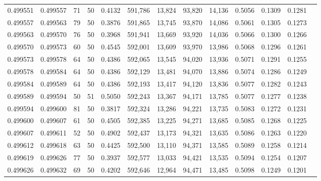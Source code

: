 \begin{tabular}{rrrrrrrrrrrrr}
0.499551 & 0.499557 &    71 &  50 &                                     0.4132 & 591,786 &  13,824 &  93,820 &  14,136 & 0.5056 & 0.1309 & 0.1281 \\
0.499557 & 0.499563 &    79 &  50 &                                     0.3876 & 591,865 &  13,745 &  93,870 &  14,086 & 0.5061 & 0.1305 & 0.1273 \\
0.499563 & 0.499570 &    76 &  50 &                                     0.3968 & 591,941 &  13,669 &  93,920 &  14,036 & 0.5066 & 0.1300 & 0.1266 \\
0.499570 & 0.499573 &    60 &  50 &                                     0.4545 & 592,001 &  13,609 &  93,970 &  13,986 & 0.5068 & 0.1296 & 0.1261 \\
0.499573 & 0.499578 &    64 &  50 &                                     0.4386 & 592,065 &  13,545 &  94,020 &  13,936 & 0.5071 & 0.1291 & 0.1255 \\
0.499578 & 0.499584 &    64 &  50 &                                     0.4386 & 592,129 &  13,481 &  94,070 &  13,886 & 0.5074 & 0.1286 & 0.1249 \\
0.499584 & 0.499589 &    64 &  50 &                                     0.4386 & 592,193 &  13,417 &  94,120 &  13,836 & 0.5077 & 0.1282 & 0.1243 \\
0.499589 & 0.499594 &    50 &  51 &                                     0.5050 & 592,243 &  13,367 &  94,171 &  13,785 & 0.5077 & 0.1277 & 0.1238 \\
0.499594 & 0.499600 &    81 &  50 &                                     0.3817 & 592,324 &  13,286 &  94,221 &  13,735 & 0.5083 & 0.1272 & 0.1231 \\
0.499600 & 0.499607 &    61 &  50 &                                     0.4505 & 592,385 &  13,225 &  94,271 &  13,685 & 0.5085 & 0.1268 & 0.1225 \\
0.499607 & 0.499611 &    52 &  50 &                                     0.4902 & 592,437 &  13,173 &  94,321 &  13,635 & 0.5086 & 0.1263 & 0.1220 \\
0.499612 & 0.499618 &    63 &  50 &                                     0.4425 & 592,500 &  13,110 &  94,371 &  13,585 & 0.5089 & 0.1258 & 0.1214 \\
0.499619 & 0.499626 &    77 &  50 &                                     0.3937 & 592,577 &  13,033 &  94,421 &  13,535 & 0.5094 & 0.1254 & 0.1207 \\
0.499626 & 0.499632 &    69 &  50 &                                     0.4202 & 592,646 &  12,964 &  94,471 &  13,485 & 0.5098 & 0.1249 & 0.1201 \\

\end{tabular}
